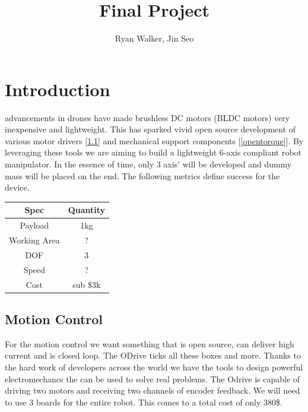 \documentclass[12pt,journal,compsoc]{IEEEtran}
\begin{document}
\title{Final Project}

\author{Ryan Walker, Jin Seo}

\IEEEtitleabstractindextext{%
}

\maketitle
\IEEEpeerreviewmaketitle

\section{Introduction}
 advancements in drones have made brushless DC motors (BLDC motors) very inexpensive and lightweight. This has sparked vivid open source development of various motor drivers [\ref{odrive}] and mechanical support components [\ref{opentorque}]. By leveraging these tools we are aiming to build a lightweight 6-axis compliant robot manipulator. In the essence of time, only 3 axis' will be developed and dummy mass will be placed on the end. The following metrics define success for the device.

\begin{center}
\begin{tabular}{ c|c } 
 Spec & Quantity  \\ 
 \hline
 Payload & 1kg \\ 
 Working Area & ? \\ 
 DOF & 3 \\ 
 Speed & ?  \\ 
 Cost & sub \$3k  \\ 
\end{tabular}
\end{center}

\subsection{Motion Control}
\label{odrive}
For the motion control we want something that is open source, can deliver high current and is closed loop. The ODrive ticks all these boxes and more. Thanks to the hard work of developers across the world we have the tools to design powerful electromechancs the can be used to solve real problems. The Odrive is capable of driving two motors and receiving two channels of encoder feedback. We will need to use 3 boards for the entire robot. This comes to a total cost of only 380\$.
  
\end{document}
